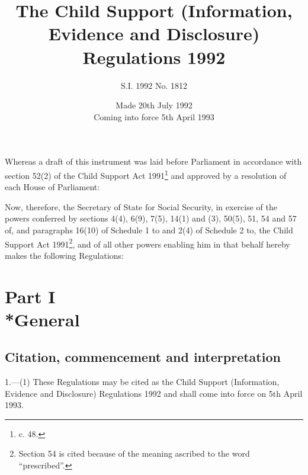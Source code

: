 \documentclass[a4paper]{article}
\title{The Child Support (Information, Evidence and Disclosure) Regulations 1992}
\author{S.I. 1992 No. 1812}
\date{Made 20th July 1992\\Coming into force 5th April 1993}
\newcommand{\parthead}{}
\begin{document}
\maketitle

\noindent
Whereas a draft of this instrument was laid before Parliament in accordance with section 52(2) of the Child Support Act 1991\footnote{ c. 48.} and approved by a resolution of each House of Parliament:

 Now, therefore, the Secretary of State for Social Security, in exercise of the powers conferred by sections 4(4), 6(9), 7(5), 14(1) and (3), 50(5), 51, 54 and 57 of, and paragraphs 16(10) of Schedule 1 to and 2(4) of Schedule 2 to, the Child Support Act 1991\footnote{\frenchspacing Section 54 is cited because of the meaning ascribed to the word “prescribed”.}, and of all other powers enabling him in that behalf hereby makes the following Regulations:

{\sloppy

\tableofcontents

}

\setcounter{secnumdepth}{-2}

\section[Part I --- General]{Part I\\*General}

\renewcommand\parthead{--- Part I}

\subsection[1. Citation, commencement and interpretation]{Citation, commencement and interpretation}

1.—(1) These Regulations may be cited as the Child Support (Information, Evidence and Disclosure) Regulations 1992 and shall come into force on 5th April 1993.
\end{document}
